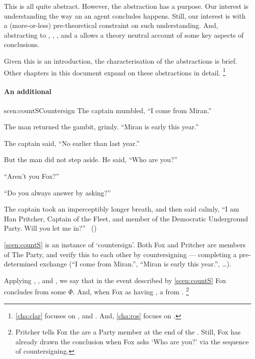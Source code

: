 \begin{note}
  This is all quite abstract.
  However, the abstraction has a purpose.
  Our interest is understanding the way an  an agent concludes happens.
  Still, our interest is with a (more-or-less) pre-theoretical constraint on such understanding.
  And, abstracting to , , , and a  allows a theory neutral account of some key aspects of conclusions.

  Given this is an introduction, the characterisation of the abstractions is brief.
  Other chapters in this document expand on these abstractions in detail.%
  \footnote{
    \autoref{cha:clar} focuses on ,  and .
    And, \autoref{cha:ros} focues on .
  }
\end{note}



\paragraph*{An additional }


\begin{note}
  \begin{rscenario}{scen:countS}{Countersign}%
    \indent The captain mumbled, ``I come from Miran.''

    The man returned the gambit, grimly.
    ``Miran is early this year.''

    The captain said, ``No earlier than last year.''

    But the man did not step aside.
    He said, ``Who are you?''

    ``Aren't you Fox?''

    ``Do you always answer by asking?''

    The captain took an imperceptibly longer breath, and then said calmly,
    ``I am Han Pritcher, Captain of the Fleet, and member of the Democratic Underground Party.
    Will you let me in?''%
    \mbox{ }\hfill\mbox{(\cite[70]{Asimov:1945aa})}%
    \newline
  \end{rscenario}

  \noindent%
  \autoref{scen:countS} is an instance of `countersign'.
  Both Fox and Pritcher are members of The Party, and verify this to each other by countersigning --- completing a pre-determined exchange (``I come from Miran.'', ``Miran is early this year.'', \dots).

  \noindent%
  Applying , , and , we say that in the event described by \autoref{scen:countS} Fox concludes  from some \pool{} \(\Phi\).
  And, when Fox \evals{} \propI{\signConA{}} as having , a  from .%
  \footnote{
    Pritcher tells Fox the are a Party member at the end of the \scen{}.
    Still, Fox has already drawn the conclusion when Fox asks `Who are you?' via the sequence of countersigning.
  }
\end{note}


